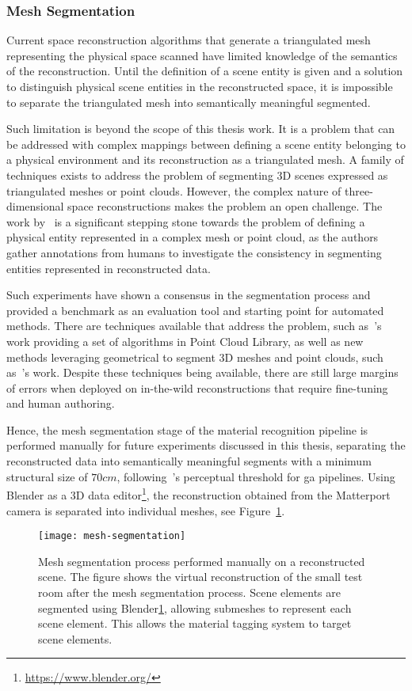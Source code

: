 \subsubsection{Mesh Segmentation}
Current space reconstruction algorithms that generate a triangulated mesh representing the physical space scanned have limited knowledge of the semantics of the reconstruction. Until the definition of a scene entity is given and a solution to distinguish physical scene entities in the reconstructed space, it is impossible to separate the triangulated mesh into semantically meaningful segmented.\par
Such limitation is beyond the scope of this thesis work. It is a problem that can be addressed with complex mappings between defining a scene entity belonging to a physical environment and its reconstruction as a triangulated mesh. A family of techniques exists to address the problem of segmenting 3D scenes expressed as triangulated meshes or point clouds. However, the complex nature of three-dimensional space reconstructions makes the problem an open challenge. The work by~\cite{chen2009benchmark} is a significant stepping stone towards the problem of defining a physical entity represented in a complex mesh or point cloud, as the authors gather annotations from humans to investigate the consistency in segmenting entities represented in reconstructed data.\par
Such experiments have shown a consensus in the segmentation process and provided a benchmark as an evaluation tool and starting point for automated methods. There are techniques available that address the problem, such as~\cite{rusu2011pcl}'s work providing a set of algorithms in Point Cloud Library, as well as new methods leveraging geometrical  to segment 3D meshes and point clouds, such as~\cite{feng2020semantic3d}'s work. Despite these techniques being available, there are still large margins of errors when deployed on in-the-wild reconstructions that require fine-tuning and human authoring.\par
Hence, the mesh segmentation stage of the material recognition pipeline is performed manually for future experiments discussed in this thesis, separating the reconstructed data into semantically meaningful segments with a minimum structural size of $70cm$, following~\cite{pelzer2010frequency}'s perceptual threshold for \acrshort{ga} pipelines. Using Blender as a 3D data editor\footnote{\url{https://www.blender.org/}\label{fn:blender}}, the reconstruction obtained from the Matterport camera is separated into individual meshes, see Figure~\ref{fig:mesh-segmentation}.\par
\begin{figure}
    \centering
    \texttt{[image: mesh-segmentation]}
    \caption[Mesh segmentation process]{Mesh segmentation process performed manually on a reconstructed scene. The figure shows the virtual reconstruction of the small test room after the mesh segmentation process. Scene elements are segmented using Blender\ref{fn:blender}, allowing submeshes to represent each scene element. This allows the material tagging system to target scene elements.}
    \label{fig:mesh-segmentation}
\end{figure}


